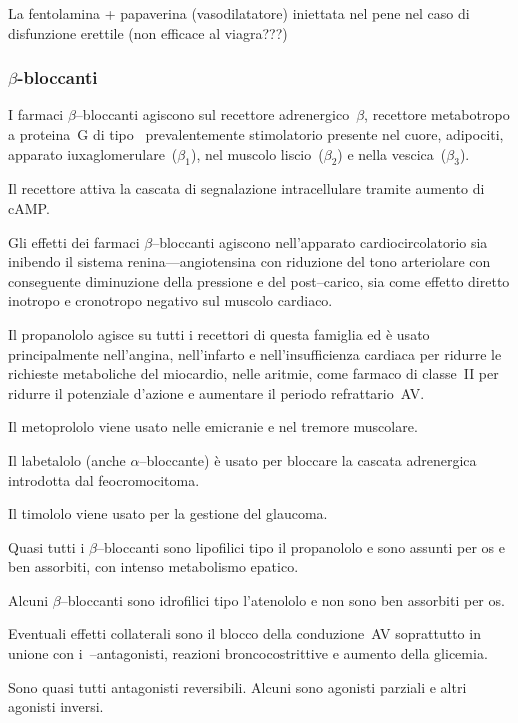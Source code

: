 La fentolamina + papaverina (vasodilatatore) iniettata nel pene nel caso di disfunzione erettile (non efficace al viagra???)

\subsubsection{$\beta$-bloccanti}

I farmaci $\beta$--bloccanti agiscono sul recettore adrenergico~$\beta$, recettore metabotropo a proteina~G di tipo~ prevalentemente stimolatorio presente nel cuore, adipociti, apparato iuxaglomerulare~($\beta_1$), nel muscolo liscio~($\beta_2$) e nella vescica~($\beta_3$).

Il recettore attiva la cascata di segnalazione intracellulare tramite aumento di cAMP.

Gli effetti dei farmaci $\beta$--bloccanti agiscono nell'apparato cardiocircolatorio sia inibendo il sistema renina---angiotensina con riduzione del tono arteriolare con conseguente diminuzione della pressione e del post--carico, sia come effetto diretto inotropo e cronotropo negativo sul muscolo cardiaco.

Il propanololo agisce su tutti i recettori di questa famiglia ed è usato principalmente nell'angina, nell'infarto e nell'insufficienza cardiaca per ridurre le richieste metaboliche del miocardio, nelle aritmie, come farmaco di classe~II per ridurre il potenziale d'azione e aumentare il periodo refrattario~AV.

Il metoprololo viene usato nelle emicranie e nel tremore muscolare.

Il labetalolo (anche $\alpha$--bloccante) è usato per bloccare la cascata adrenergica introdotta dal feocromocitoma.

Il timololo viene usato per la gestione del glaucoma.

Quasi tutti i $\beta$--bloccanti sono lipofilici tipo il propanololo e sono assunti per os e ben assorbiti, con intenso metabolismo epatico.

Alcuni $\beta$--bloccanti sono idrofilici tipo l'atenololo e non sono ben assorbiti per os. 

Eventuali effetti collaterali sono il blocco della conduzione~AV soprattutto in unione con i~--antagonisti, reazioni broncocostrittive e aumento della glicemia.

Sono quasi tutti antagonisti reversibili. Alcuni sono agonisti parziali e altri agonisti inversi. 

